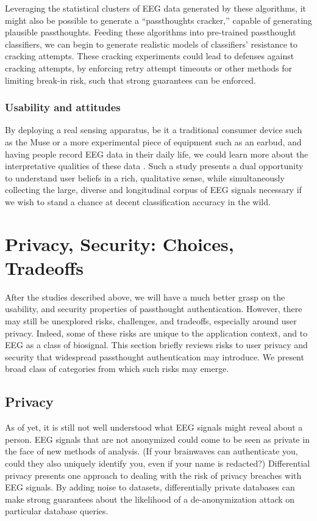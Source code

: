 \documentclass[sigconf]{acmart}
\begin{document}
Leveraging the statistical clusters of EEG data generated by these algorithms, it might also be possible to generate a ``passthoughts cracker,'' capable of generating plausible passthoughts. 
Feeding these algorithms into pre-trained passthought classifiers, we can begin to generate realistic models of classifiers' resistance to cracking attempts. 
These cracking experiments could lead to defenses against cracking attempts, by enforcing retry attempt timeouts or other methods for limiting break-in risk, such that strong guarantees can be enforced.

\subsubsection{Usability and attitudes}
\label{sec:org2d7c8ef}

By deploying a real sensing apparatus, be it a traditional consumer device such as the Muse \cite{Mihajlovic2015} 
or a more experimental piece of equipment such as an earbud,
and having people record EEG data in their daily life, we could learn more about the interpretative qualities of these data \cite{NafusDawn;Sherman2014}.
Such a study presents a dual opportunity to understand user beliefs in a rich, qualitative sense, while simultaneously collecting the large, diverse and longitudinal corpus of EEG signals necessary if we wish to stand a chance at decent classification accuracy in the wild.

\section{Privacy, Security: Choices, Tradeoffs}
\label{sec:org6a62d37}

After the studies described above, 
we will have a much better grasp on the usability, and security properties of passthought authentication.
However, there may still be unexplored risks, challenges, and tradeoffs,
especially around user privacy.
Indeed, some of these risks are unique to the application context, and to EEG as a class of biosignal. 
This section briefly reviews risks to user privacy and security that widespread passthought authentication may introduce. 
We present broad class of categories from which such risks may emerge. 

\subsection{Privacy}
\label{sec:org035dd6e}
As of yet, it is still not well understood what EEG signals might reveal about a person.
EEG signals that are not anonymized could come to be seen as private in the face of new methods of analysis.
(If your brainwaves can authenticate you, could they also uniquely identify you, even if your name is redacted?)
Differential privacy \cite{Dwork2014} presents one approach to dealing with the risk of privacy breaches with EEG signals.
By adding noise to datasets, differentially private databases can make strong guarantees about the likelihood of a de-anonymization attack on particular database queries.
\end{document}
